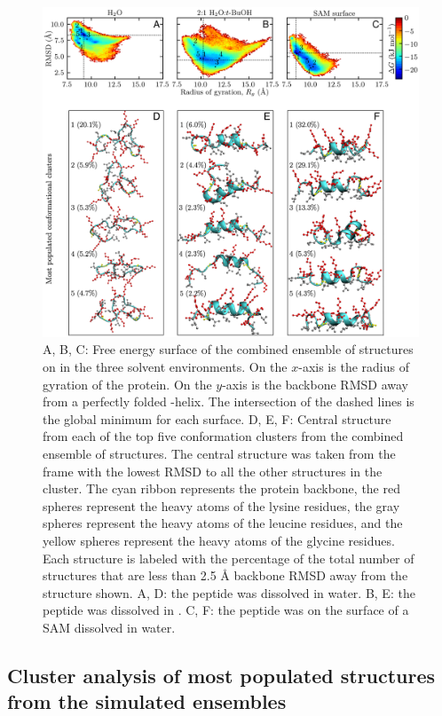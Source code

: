 \begin{figure}
    \center
    \includegraphics[width=5.50in]{figures-helix/clusters_revisions.png}
    \caption{
        A, B, C: Free energy surface of the combined ensemble of structures on \pep{} in the three solvent environments. 
        On the $x$-axis is the radius of gyration of the protein. 
        On the $y$-axis is the backbone RMSD away from a perfectly folded \textalpha{}-helix. 
        The intersection of the dashed lines is the global minimum for each surface. 
        D, E, F: Central structure from each of the top five conformation clusters from the combined ensemble of structures. 
        The central structure was taken from the frame with the lowest RMSD to all the other structures in the cluster. 
        The cyan ribbon represents the protein backbone, the red spheres represent the heavy atoms of the lysine residues, the gray spheres represent the heavy atoms of the leucine residues, and the yellow spheres represent the heavy atoms of the glycine residues. 
        Each structure is labeled with the percentage of the total number of structures that are less than 2.5 \si{\angstrom} backbone RMSD away from the structure shown. 
        A, D: the peptide was dissolved in water. 
        B, E: the peptide was dissolved in \tbawat{}. 
        C, F: the peptide was on the surface of a SAM dissolved in water.
    }
    \label{fig:helix-free_cluster}
\end{figure}

\subsection{Cluster analysis of most populated structures from the simulated ensembles}

